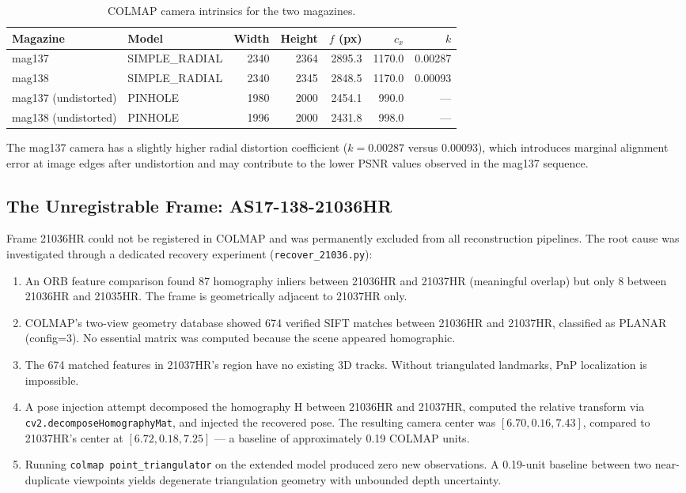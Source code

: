 \documentclass[12pt]{article}
\begin{document}
\begin{table}[H]
\centering
\caption{COLMAP camera intrinsics for the two magazines.}
\label{tab:intrinsics}
\begin{tabular}{llrrrrr}
\toprule
Magazine & Model & Width & Height & $f$ (px) & $c_x$ & $k$ \\
\midrule
mag137 & SIMPLE\_RADIAL & 2340 & 2364 & 2895.3 & 1170.0 & 0.00287 \\
mag138 & SIMPLE\_RADIAL & 2340 & 2345 & 2848.5 & 1170.0 & 0.00093 \\
\midrule
mag137 (undistorted) & PINHOLE & 1980 & 2000 & 2454.1 & 990.0 & --- \\
mag138 (undistorted) & PINHOLE & 1996 & 2000 & 2431.8 & 998.0 & --- \\
\bottomrule
\end{tabular}
\end{table}

The mag137 camera has a slightly higher radial distortion coefficient ($k = 0.00287$ versus $0.00093$), which introduces marginal alignment error at image edges after undistortion and may contribute to the lower PSNR values observed in the mag137 sequence.

\subsection{The Unregistrable Frame: AS17-138-21036HR}

Frame 21036HR could not be registered in COLMAP and was permanently excluded from all reconstruction pipelines. The root cause was investigated through a dedicated recovery experiment (\texttt{recover\_21036.py}):

\begin{enumerate}
    \item An ORB feature comparison found 87 homography inliers between 21036HR and 21037HR (meaningful overlap) but only 8 between 21036HR and 21035HR. The frame is geometrically adjacent to 21037HR only.
    \item COLMAP's two-view geometry database showed 674 verified SIFT matches between 21036HR and 21037HR, classified as PLANAR (config=3). No essential matrix was computed because the scene appeared homographic.
    \item The 674 matched features in 21037HR's region have no existing 3D tracks. Without triangulated landmarks, PnP localization is impossible.
    \item A pose injection attempt decomposed the homography H between 21036HR and 21037HR, computed the relative transform via \texttt{cv2.decomposeHomographyMat}, and injected the recovered pose. The resulting camera center was $[6.70, 0.16, 7.43]$, compared to 21037HR's center at $[6.72, 0.18, 7.25]$ --- a baseline of approximately 0.19 COLMAP units.
    \item Running \texttt{colmap point\_triangulator} on the extended model produced zero new observations. A 0.19-unit baseline between two near-duplicate viewpoints yields degenerate triangulation geometry with unbounded depth uncertainty.
\end{enumerate}
\end{document}
